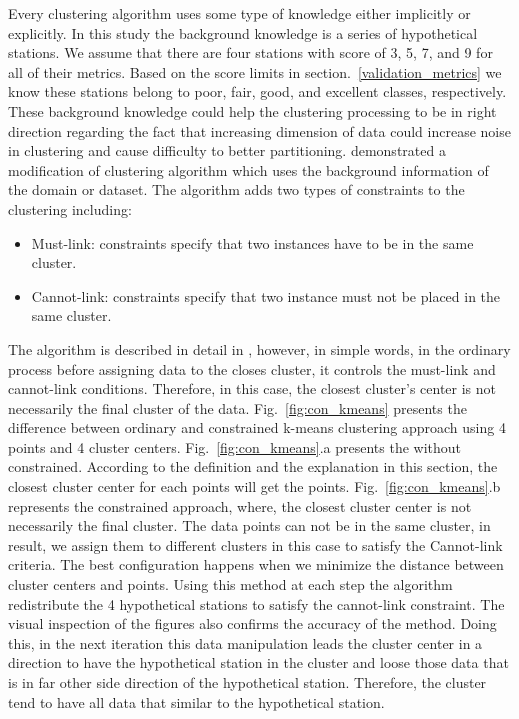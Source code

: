 Every clustering algorithm uses some type of knowledge either implicitly or explicitly. In this study the background knowledge is a series of hypothetical stations. We assume that there are four stations with score of 3, 5, 7, and 9 for all of their metrics. Based on the score limits in section.~\ref{validation_metrics} we know these stations belong to poor, fair, good, and excellent classes, respectively. These background knowledge could help the clustering processing to be in right direction regarding the fact that increasing dimension of data could increase noise in clustering and cause difficulty to better partitioning. \citet{Wagstaff_2001_Proc}  demonstrated a modification of \kmeans{} clustering algorithm which uses the background information of the domain or dataset. The algorithm adds two types of constraints to the clustering including:\\
\begin{itemize}
\item{Must-link: constraints specify that two instances have to be in the same cluster.}
\item{Cannot-link: constraints specify that two instance must not be placed in the same cluster.}
\end{itemize} 
The algorithm is described in detail in \citet{Wagstaff_2001_Proc}, however, in simple words, in the ordinary \kmeans{} process before assigning data to the closes cluster, it controls the must-link and cannot-link conditions. Therefore, in this case, the closest cluster's center is not necessarily the final cluster of the data. Fig.~\ref{fig:con_kmeans} presents the difference between ordinary and constrained k-means clustering approach using 4 points and 4 cluster centers. Fig.~\ref{fig:con_kmeans}.a presents the \kmeans{} without constrained. According to the definition and the explanation in this section, the closest cluster center for each points will get the points.
Fig.~\ref{fig:con_kmeans}.b represents the constrained \kmeans{} approach, where, the closest cluster center is not necessarily the final cluster. The data points can not be in the same cluster, in result,  we assign them to different clusters in this case to satisfy the Cannot-link criteria. The best configuration happens when we minimize the distance between cluster centers and points. Using this method at each step the algorithm redistribute the 4 hypothetical stations to satisfy the cannot-link constraint. The visual inspection of the figures also confirms the accuracy of the method. Doing this, in the next iteration this data manipulation leads the cluster center in a direction to have the hypothetical station in the cluster and loose those data that is in far other side direction of the hypothetical station. Therefore, the cluster tend to have all data that similar to the hypothetical station. \\
